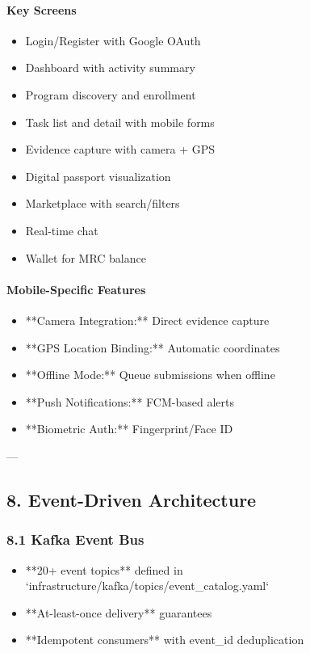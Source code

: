 \documentclass[11pt,a4paper]{article}
\begin{document}
\paragraph{Key Screens}

\begin{itemize}
\item Login/Register with Google OAuth
\item Dashboard with activity summary
\item Program discovery and enrollment
\item Task list and detail with mobile forms
\item Evidence capture with camera + GPS
\item Digital passport visualization
\item Marketplace with search/filters
\item Real-time chat
\item Wallet for MRC balance
\end{itemize}

\paragraph{Mobile-Specific Features}

\begin{itemize}
\item **Camera Integration:** Direct evidence capture
\item **GPS Location Binding:** Automatic coordinates
\item **Offline Mode:** Queue submissions when offline
\item **Push Notifications:** FCM-based alerts
\item **Biometric Auth:** Fingerprint/Face ID
\end{itemize}

---

\subsection{8. Event-Driven Architecture}

\subsubsection{8.1 Kafka Event Bus}


\begin{itemize}
\item **20+ event topics** defined in `infrastructure/kafka/topics/event_catalog.yaml`
\item **At-least-once delivery** guarantees
\item **Idempotent consumers** with event_id deduplication
\end{itemize}
\end{document}
